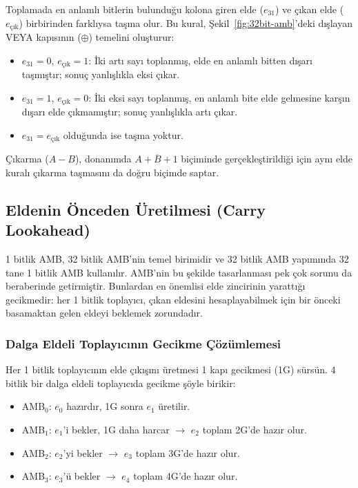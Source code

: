 \begin{bilginot}\label{bilginot:tasma-elde}
Toplamada en anlamlı bitlerin bulunduğu kolona giren elde ($e_{31}$) ve çıkan elde ($e_{\text{çık}}$) birbirinden farklıysa taşma olur. Bu kural, Şekil~\ref{fig:32bit-amb}'deki dışlayan VEYA kapısının ($\oplus$) temelini oluşturur:

\begin{itemize}
\item $e_{31} = 0$, $e_{\text{çık}} = 1$: İki artı sayı toplanmış, elde en anlamlı bitten dışarı taşmıştır; sonuç yanlışlıkla eksi çıkar.
\item $e_{31} = 1$, $e_{\text{çık}} = 0$: İki eksi sayı toplanmış, en anlamlı bite elde gelmesine karşın dışarı elde çıkmamıştır; sonuç yanlışlıkla artı çıkar.
\item $e_{31} = e_{\text{çık}}$ olduğunda ise taşma yoktur.
\end{itemize}

Çıkarma ($A - B$), donanımda $A + \overline{B} + 1$ biçiminde gerçekleştirildiği için aynı elde kuralı çıkarma taşmasını da doğru biçimde saptar.
\end{bilginot}

\subsection{Eldenin Önceden Üretilmesi (Carry Lookahead)}
\label{sec:carry-lookahead}

1 bitlik AMB, 32 bitlik AMB'nin temel birimidir ve 32 bitlik AMB yapımında 32 tane 1 bitlik AMB kullanılır. AMB'nin bu şekilde tasarlanması pek çok sorunu da beraberinde getirmiştir. Bunlardan en önemlisi elde zincirinin yarattığı gecikmedir: her 1 bitlik toplayıcı, çıkan eldesini hesaplayabilmek için bir önceki basamaktan gelen eldeyi beklemek zorundadır.

\subsubsection*{Dalga Eldeli Toplayıcının Gecikme Çözümlemesi}
Her 1 bitlik toplayıcının elde çıkışını üretmesi 1 kapı gecikmesi (1G) sürsün. 4 bitlik bir dalga eldeli toplayıcıda gecikme şöyle birikir:

\begin{itemize}
\item AMB$_0$: $e_0$ hazırdır, 1G sonra $e_1$ üretilir.
\item AMB$_1$: $e_1$'i bekler, 1G daha harcar $\rightarrow$ $e_2$ toplam 2G'de hazır olur.
\item AMB$_2$: $e_2$'yi bekler $\rightarrow$ $e_3$ toplam 3G'de hazır olur.
\item AMB$_3$: $e_3$'ü bekler $\rightarrow$ $e_4$ toplam 4G'de hazır olur.
\end{itemize}

